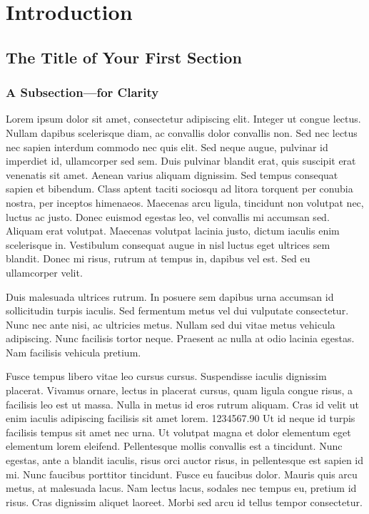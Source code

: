 \chapter{Introduction}
\section{The Title of Your First Section}
\subsection{A Subsection---for Clarity}
Lorem ipsum dolor sit amet, consectetur adipiscing elit.\cite{pericles} Integer ut congue lectus. Nullam dapibus scelerisque diam, ac convallis dolor convallis non. Sed nec lectus nec sapien interdum commodo nec quis elit. Sed neque augue, pulvinar id imperdiet id, ullamcorper sed sem. Duis pulvinar blandit erat, quis suscipit erat venenatis sit amet. Aenean varius aliquam dignissim. Sed tempus consequat sapien et bibendum. Class aptent taciti sociosqu ad litora torquent per conubia nostra, per inceptos himenaeos. Maecenas arcu ligula, tincidunt non volutpat nec, luctus ac justo. Donec euismod egestas leo, vel convallis mi accumsan sed. Aliquam erat volutpat. Maecenas volutpat lacinia justo, dictum iaculis enim scelerisque in. Vestibulum consequat augue in nisl luctus eget ultrices sem blandit. Donec mi risus, rutrum at tempus in, dapibus vel est. Sed eu ullamcorper velit.\cite{pericles,thekingsenglish}

Duis malesuada ultrices rutrum. In posuere sem dapibus urna accumsan id sollicitudin turpis iaculis. Sed fermentum metus vel dui vulputate consectetur. Nunc nec ante nisi, ac ultricies metus. Nullam sed dui vitae metus vehicula adipiscing. Nunc facilisis tortor neque. Praesent ac nulla at odio lacinia egestas. Nam facilisis vehicula pretium.

Fusce tempus libero vitae leo cursus cursus. Suspendisse iaculis dignissim placerat. Vivamus ornare, lectus in placerat cursus, quam ligula congue risus, a facilisis leo est ut massa. Nulla in metus id eros rutrum aliquam. Cras id velit ut enim iaculis adipiscing facilisis sit amet lorem. 1234567.90 Ut id neque id turpis facilisis tempus sit amet nec urna.\cite{bioluminescence:ch1} Ut volutpat magna et dolor elementum eget elementum lorem eleifend. Pellentesque mollis convallis est a tincidunt. Nunc egestas, ante a blandit iaculis, risus orci auctor risus, in pellentesque est sapien id mi. Nunc faucibus porttitor tincidunt.\cite{atkins_inorgchem,atkins_physchem} Fusce eu faucibus dolor. Mauris quis arcu metus, at malesuada lacus. Nam lectus lacus, sodales nec tempus eu, pretium id risus. Cras dignissim aliquet laoreet. Morbi sed arcu id tellus tempor consectetur.\cite{bioluminescence:apA,hori1973}

